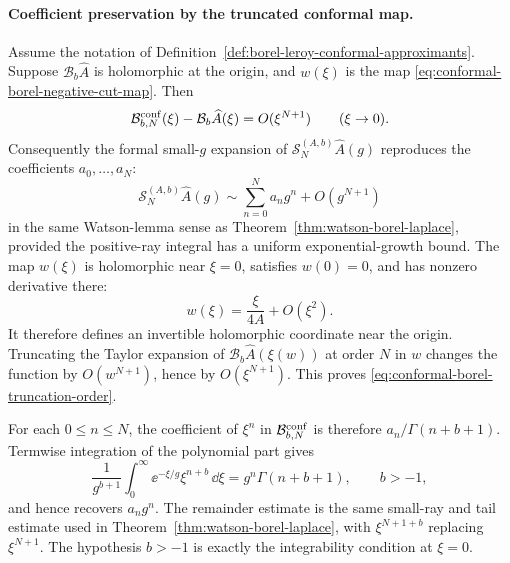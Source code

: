 \paragraph{Coefficient preservation by the truncated conformal map.}
Assume the notation of
Definition~\ref{def:borel-leroy-conformal-approximants}.  Suppose
\(\mathcal B_b\widehat A\) is holomorphic at the origin, and \(w(\xi)\) is the
map \eqref{eq:conformal-borel-negative-cut-map}.  Then
\begin{equation}
  \mathcal B_{b,N}^{\rm conf}(\xi)
  -
  \mathcal B_b\widehat A(\xi)
  =
  O(\xi^{N+1})
  \qquad(\xi\to0).
  \label{eq:conformal-borel-truncation-order}
\end{equation}
Consequently the formal small-\(g\) expansion of
\(\mathcal S_N^{(A,b)}\widehat A(g)\) reproduces the coefficients
\(a_0,\ldots,a_N\):
\begin{equation}
  \mathcal S_N^{(A,b)}\widehat A(g)
  \sim
  \sum_{n=0}^N a_n g^n
  +
  O(g^{N+1})
  \label{eq:conformal-borel-leroy-reproduces-input}
\end{equation}
in the same Watson-lemma sense as
Theorem~\ref{thm:watson-borel-laplace}, provided the positive-ray integral has
a uniform exponential-growth bound.
The map \(w(\xi)\) is holomorphic near \(\xi=0\), satisfies \(w(0)=0\), and
has nonzero derivative there:
\[
  w(\xi)=\frac{\xi}{4A}+O(\xi^2).
\]
It therefore defines an invertible holomorphic coordinate near the origin.
Truncating the Taylor expansion of
\(\mathcal B_b\widehat A(\xi(w))\) at order \(N\) in \(w\) changes the function
by \(O(w^{N+1})\), hence by \(O(\xi^{N+1})\).  This proves
\eqref{eq:conformal-borel-truncation-order}.

For each \(0\le n\le N\), the coefficient of \(\xi^n\) in
\(\mathcal B_{b,N}^{\rm conf}\) is therefore
\(a_n/\Gamma(n+b+1)\).  Termwise integration of the polynomial part gives
\begin{equation}
  \frac1{g^{b+1}}
  \int_0^\infty
  \ee^{-\xi/g}\xi^{n+b}\,\dd\xi
  =
  g^n\Gamma(n+b+1),
  \qquad b>-1,
  \label{eq:borel-leroy-gamma-normalization}
\end{equation}
and hence recovers \(a_n g^n\).  The remainder estimate is the same small-ray
and tail estimate used in
Theorem~\ref{thm:watson-borel-laplace}, with \(\xi^{N+1+b}\) replacing
\(\xi^{N+1}\).  The hypothesis \(b>-1\) is exactly the integrability condition
at \(\xi=0\).

